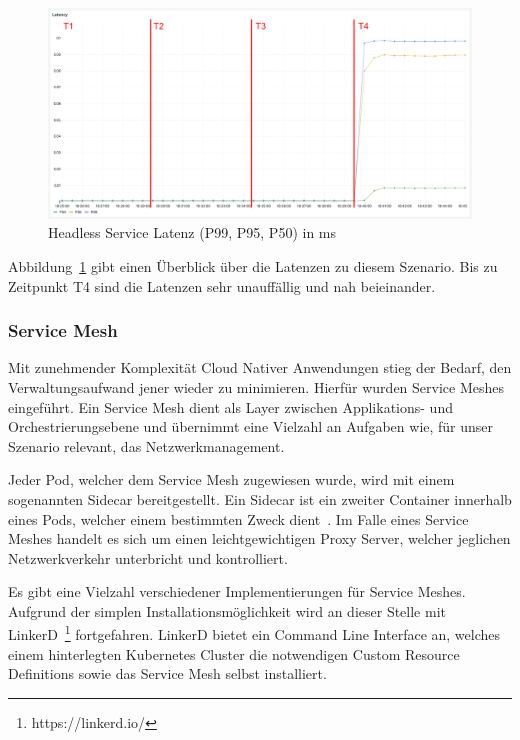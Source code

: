 \begin{figure}[H]
    \centering
    \includegraphics[width=1\textwidth]{img/headless_latenz}
    \caption{Headless Service Latenz (P99, P95, P50) in ms}
    \label{fig:headless_latenz}
\end{figure}

Abbildung~\ref{fig:headless_latenz} gibt einen Überblick über die Latenzen zu diesem Szenario.
Bis zu Zeitpunkt T4 sind die Latenzen sehr unauffällig und nah beieinander.

\subsubsection{Service Mesh}\label{subsubsec:mesh}

Mit zunehmender Komplexität Cloud Nativer Anwendungen stieg der Bedarf, den Verwaltungsaufwand jener wieder zu minimieren.
Hierfür wurden Service Meshes eingeführt.
Ein Service Mesh dient als Layer zwischen Applikations- und Orchestrierungsebene und übernimmt eine Vielzahl an Aufgaben wie, für unser Szenario relevant, das Netzwerkmanagement.

Jeder Pod, welcher dem Service Mesh zugewiesen wurde, wird mit einem sogenannten Sidecar bereitgestellt.
Ein Sidecar ist ein zweiter Container innerhalb eines Pods, welcher einem bestimmten Zweck dient~\cite{koschel2021look}.
Im Falle eines Service Meshes handelt es sich um einen leichtgewichtigen Proxy Server, welcher jeglichen Netzwerkverkehr unterbricht und kontrolliert.

Es gibt eine Vielzahl verschiedener Implementierungen für Service Meshes.
Aufgrund der simplen Installationsmöglichkeit wird an dieser Stelle mit LinkerD~\footnote{https://linkerd.io/} fortgefahren.
LinkerD bietet ein Command Line Interface an, welches einem hinterlegten Kubernetes Cluster die notwendigen Custom Resource Definitions sowie das Service Mesh selbst installiert.

